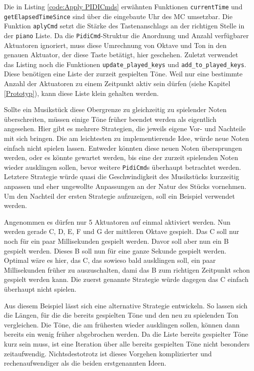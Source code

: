 Die in Listing \ref{code:Apply PIDICmds} erwähnten Funktionen \lstinline{currentTime} und \lstinline{getElapsedTimeSince} sind über die eingebaute Uhr des \ac{MC} umsetzbar.
Die Funktion \lstinline{aplyCmd} setzt die Stärke des Tastenanschlags an der richtigen Stelle in der \lstinline{piano} Liste.
Da die \lstinline{PidiCmd}-Struktur die Anordnung und Anzahl verfügbarer Aktuatoren ignoriert, muss diese Umrechnung von Oktave und Ton in den genauen Aktuator, der diese Taste betätigt, hier geschehen.
Zuletzt verwendet das Listing noch die Funktionen \lstinline{update_played_keys} und \lstinline{add_to_played_keys}.
Diese benötigen eine Liste der zurzeit gespielten Töne.
Weil nur eine bestimmte Anzahl der Aktuatoren zu einem Zeitpunkt aktiv sein dürfen (siehe Kapitel \ref{Prototyp}), kann diese Liste klein gehalten werden.

Sollte ein Musikstück diese Obergrenze zu gleichzeitig zu spielender Noten überschreiten, müssen einige Töne früher beendet werden als eigentlich angesehen.
Hier gibt es mehrere Strategien, die jeweils eigene Vor- und Nachteile mit sich bringen.
Die am leichtesten zu implementierende Idee, würde neue Noten einfach nicht spielen lassen.
Entweder könnten diese neuen Noten übersprungen werden, oder es könnte gewartet werden, bis eine der zurzeit spielenden Noten wieder ausklingen sollen, bevor weitere \lstinline{PidiCmd}s überhaupt betrachtet werden.
Letztere Strategie würde quasi die Geschwindigkeit des Musikstücks kurzzeitig anpassen und eher ungewollte Anpassungen an der Natur des Stücks vornehmen.
Um den Nachteil der ersten Strategie aufzuzeigen, soll ein Beispiel verwendet werden.

Angenommen es dürfen nur 5 Aktuatoren auf einmal aktiviert werden.
Nun werden gerade C, D, E, F und G der mittleren Oktave gespielt.
Das C soll nur noch für ein paar Millisekunden gespielt werden.
Davor soll aber nun ein B gespielt werden.
Dieses B soll nun für eine ganze Sekunde gespielt werden.
Optimal wäre es hier, das C, das sowieso bald ausklingen soll, ein paar Millisekunden früher zu auszuschalten, dami das B zum richtigen Zeitpunkt schon gespielt werden kann.
Die zuerst genannte Strategie würde dagegen das C einfach überhaupt nicht spielen.

Aus diesem Beispiel lässt sich eine alternative Strategie entwickeln.
So lassen sich die Längen, für die die bereits gespielten Töne und den neu zu spielenden Ton vergleichen.
Die Töne, die am frühesten wieder ausklingen sollen, können dann bereits ein wenig früher abgebrochen werden.
Da die Liste bereits gespielter Töne kurz sein muss, ist eine Iteration über alle bereits gespielten Töne nicht besonders zeitaufwendig.
Nichtsdestotrotz ist dieses Vorgehen komplizierter und rechenaufwendiger als die beiden erstgenannten Ideen.


